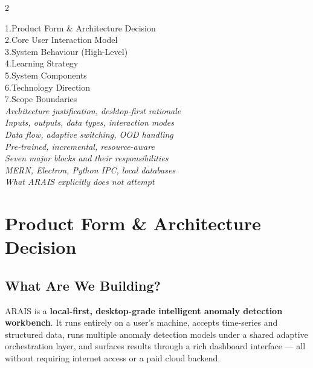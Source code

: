 \documentclass[11pt, a4paper]{article}
\begin{document}
\begin{tcolorbox}[enhanced, colback=primary, colframe=primary, arc=2pt,
  left=8pt, right=8pt, top=6pt, bottom=6pt, boxsep=1.5pt]
  \color{white}\bfseries\small
  \begin{multicols}{2}
  \raggedright
  1.\quad Product Form \& Architecture Decision\\
  2.\quad Core User Interaction Model\\
  3.\quad System Behaviour (High-Level)\\
  4.\quad Learning Strategy\\
  5.\quad System Components\\
  6.\quad Technology Direction\\
  7.\quad Scope Boundaries\\
  \columnbreak
  \normalfont\color{darkline}\small
  \textit{Architecture justification, desktop-first rationale}\\
  \textit{Inputs, outputs, data types, interaction modes}\\
  \textit{Data flow, adaptive switching, OOD handling}\\
  \textit{Pre-trained, incremental, resource-aware}\\
  \textit{Seven major blocks and their responsibilities}\\
  \textit{MERN, Electron, Python IPC, local databases}\\
  \textit{What ARAIS explicitly does not attempt}
  \end{multicols}
\end{tcolorbox}

\vspace{6pt}

\section{Product Form \& Architecture Decision}

\subsection{What Are We Building?}

ARAIS is a \textbf{local-first, desktop-grade intelligent anomaly detection workbench}.
It runs entirely on a user's machine, accepts time-series and structured data,
runs multiple anomaly detection models under a shared adaptive orchestration layer,
and surfaces results through a rich dashboard interface — all without requiring
internet access or a paid cloud backend.
\end{document}
